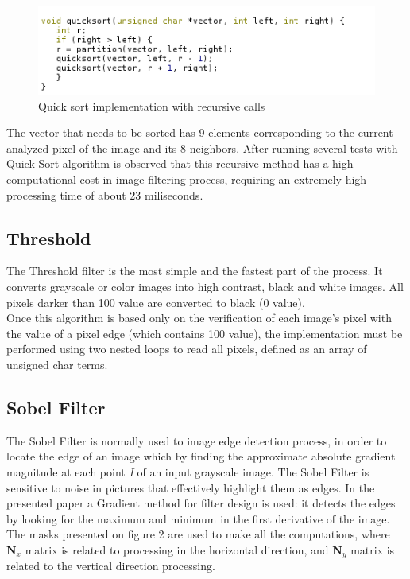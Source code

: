 \documentclass[journal]{IEEEtran}
\begin{document}
\begin{figure}[!ht]%
  \centering
  \captionsetup{justification=centering}
  \includegraphics[width=\columnwidth]{quicksort.png}
  \caption{Quick sort implementation with recursive calls}
\end{figure}

\indent The vector that needs to be sorted has 9 elements corresponding to the current analyzed pixel of the image and its 8 neighbors. After running several tests with Quick Sort algorithm is observed that this recursive method has a high computational cost in image filtering process, requiring an extremely high processing time of about 23 miliseconds.

\subsection{Threshold}
The Threshold filter is the most simple and the fastest part of the process. It converts grayscale or color images into high contrast, black and white images. All pixels darker than 100 value are converted to black (0 value).\\
\indent Once this algorithm is based only on the verification of each image's pixel with the value of a pixel edge (which contains 100 value), the implementation must be performed using two nested loops to read all pixels, defined as an array of unsigned char terms. 

\subsection{Sobel Filter}
The Sobel Filter is normally used to image edge detection process, in order to locate the edge of an image which by finding the approximate absolute gradient magnitude at each point \textit{I} of an input grayscale image. The Sobel Filter is sensitive to noise in pictures that effectively highlight them as edges. In the presented paper a Gradient method for filter design is used: it detects the edges by looking for the maximum and minimum in the first derivative of the image. The masks presented on figure 2 are used to make all the computations, where \textit{$\mathbf{N}_{x}$} matrix is related to processing in the horizontal direction, and \textit{$\mathbf{N}_{y}$} matrix is related to the vertical direction processing.
\end{document}
